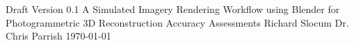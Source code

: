 \documentclass{article}
\begin{document}
\insertOSUTitleTwo
{Draft}
{Version 0.1}
{A Simulated Imagery Rendering Workflow using Blender for Photogrammetric 3D Reconstruction Accuracy Assessments}
{Richard}
{Slocum}
{Dr. Chris}
{Parrish}
{\today}
	

\cleardoublepage











\cleardoublepage

	
\end{document}
